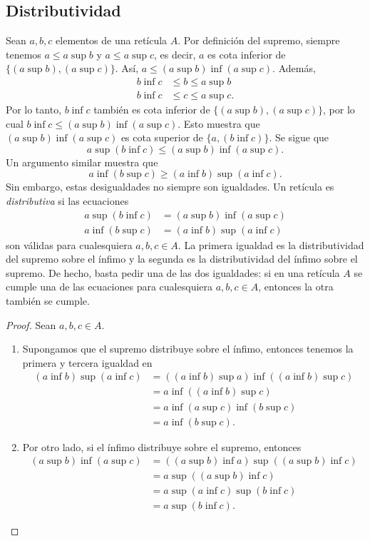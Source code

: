 \subsection*{Distributividad}

Sean $a,b,c$ elementos de una retícula $A$.
Por definición del supremo, siempre tenemos
$a\leq a\sup b$ y $a\leq a\sup c$,
es decir, $a$ es cota inferior de $\{(a\sup b),(a\sup c)\}$.
Así, $a\leq (a\sup b)\inf(a\sup c)$.
Además,
\begin{align*}
  b\inf c &\leq b\leq a\sup b \\
  b\inf c &\leq c\leq a\sup c.
\end{align*}
Por lo tanto, $b\inf c$ también es cota inferior de $\{(a\sup
b),(a\sup c)\}$, por lo cual $b\inf c\leq(a\sup b)\inf(a\sup c)$.
Esto muestra que $(a\sup b)\inf(a\sup c)$ es cota superior de
$\{a,(b\inf c)\}$. Se sigue que
\[
  a\sup(b\inf c)
  \leq (a\sup b)\inf(a\sup c)
.\]
Un argumento similar muestra que
\[
  a\inf(b\sup c)
  \geq (a\inf b)\sup(a\inf c)
.\]
Sin embargo, estas desigualdades no siempre son igualdades.
Un retícula es \emph{ distributiva } si las ecuaciones
\begin{align*}
  a\sup(b\inf c) &= (a\sup b)\inf (a\sup c) \\
  a\inf(b\sup c) &= (a\inf b)\sup(a\inf c)
\end{align*}
son válidas para cualesquiera $a,b,c\in A$.
La primera igualdad es la distributividad del supremo sobre el
ínfimo y la segunda es la distributividad del ínfimo sobre el
supremo.
De hecho, basta pedir una de las dos igualdades:
si en una retícula $A$ se cumple una de las ecuaciones para
cualesquiera $a,b,c\in A$, entonces la otra también se cumple.
\begin{proof}
    Sean $a,b,c\in A$.
    \begin{enumerate}
      \item
      Supongamos que el supremo distribuye sobre el ínfimo,
      entonces tenemos la primera y tercera igualdad en
      \begin{align*}
          (a\inf b)\sup(a\inf c)
          &= ((a\inf b)\sup a)\inf((a\inf b)\sup c) \\
          &= a\inf((a\inf b)\sup c) \\
          &= a\inf(a\sup c)\inf (b\sup c) \\
          &= a\inf (b\sup c).
      \end{align*}

      \item
      Por otro lado, si el ínfimo distribuye sobre el
      supremo, entonces
      \begin{align*}
          (a\sup b)\inf(a\sup c)
          &= ((a\sup b)\inf a)\sup((a\sup b)\inf c) \\
          &= a\sup((a\sup b)\inf c) \\
          &= a\sup (a\inf c)\sup (b\inf c) \\
          &= a\sup (b\inf c).
      \end{align*}
    \end{enumerate}
\end{proof}


